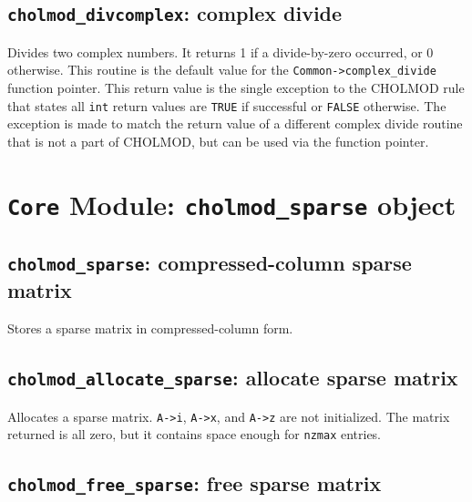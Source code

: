 \documentclass[11pt]{article}
\begin{document}
\subsection{{\tt cholmod\_divcomplex}: complex divide}


Divides two complex numbers.  It returns 1 if a divide-by-zero occurred, or 0 otherwise.
This routine is the default value for the {\tt Common->complex\_divide} function pointer.
This return value is the single exception to the CHOLMOD rule that states all {\tt int} return
values are {\tt TRUE} if successful or {\tt FALSE} otherwise.
The exception is made to match the return value of a different complex divide routine
that is not a part of CHOLMOD, but can be used via the function pointer.

\newpage \section{{\tt Core} Module: {\tt cholmod\_sparse} object}
\label{cholmod_sparse}

\subsection{{\tt cholmod\_sparse}: compressed-column sparse matrix}


Stores a sparse matrix in compressed-column form.

\subsection{{\tt cholmod\_allocate\_sparse}: allocate sparse matrix}


Allocates a sparse matrix.  {\tt A->i}, {\tt A->x}, and {\tt A->z} are not initialized.
The matrix returned is all zero, but it contains space enough for {\tt nzmax} entries.

\subsection{{\tt cholmod\_free\_sparse}: free sparse matrix}
\end{document}
